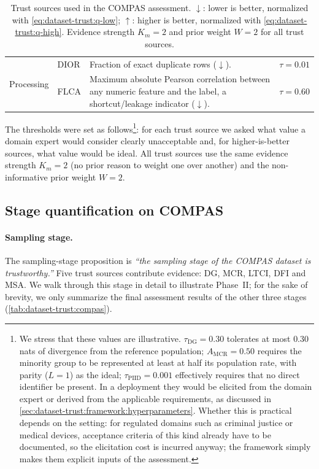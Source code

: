\begin{table}[!htbp]
\begin{tabular}{@{}llp{7.9cm}l@{}}
    \midrule
    \multirow{2}{*}{Processing}
      & DIOR & Fraction of exact duplicate rows ($\downarrow$). & $\tau=0.01$ \\
      & FLCA & Maximum absolute Pearson correlation between any numeric feature and the label, a shortcut/leakage indicator ($\downarrow$). & $\tau=0.60$ \\
    \bottomrule
  \end{tabular}
  \caption{Trust sources used in the \ac{COMPAS} assessment. $\downarrow$: lower is better, normalized with \cref{eq:dataset-trust:q-low}; $\uparrow$: higher is better, normalized with \cref{eq:dataset-trust:q-high}. Evidence strength $K_m = 2$ and prior weight $W = 2$ for all trust sources.}
  \label{tab:dataset-trust:compas-sources}
\end{table}

The thresholds were set as follows\footnote{We stress that these values are illustrative. $\tau_{\text{DG}} = 0.30$ tolerates at most $0.30$ nats of divergence from the reference population; $A_{\text{MCR}} = 0.50$ requires the minority group to be represented at least at half its population rate, with parity ($L = 1$) as the ideal; $\tau_{\text{PIID}} = 0.001$ effectively requires that no direct identifier be present. In a deployment they would be elicited from the domain expert or derived from the applicable requirements, as discussed in \cref{sec:dataset-trust:framework:hyperparameters}. Whether this is practical depends on the setting: for regulated domains such as criminal justice or medical devices, acceptance criteria of this kind already have to be documented, so the elicitation cost is incurred anyway; the framework simply makes them explicit inputs of the assessment.}: for each trust source we asked what value a domain expert would consider clearly unacceptable and, for higher-is-better sources, what value would be ideal. All trust sources use the same evidence strength $K_m = 2$ (no prior reason to weight one over another) and the non-informative prior weight $W = 2$.

\subsection{Stage quantification on COMPAS}
\label{sec:dataset-trust:applications:compas:stages}

 \paragraph{Sampling stage.}
The sampling-stage proposition is \emph{``the sampling stage of the \ac{COMPAS} dataset is trustworthy.''} Five trust sources contribute evidence: DG, MCR, LTCI, DFI and MSA. We walk through this stage in detail to illustrate Phase~II; for the sake of brevity, we only summarize the final assessment results of the other three stages (\cref{tab:dataset-trust:compas}).

